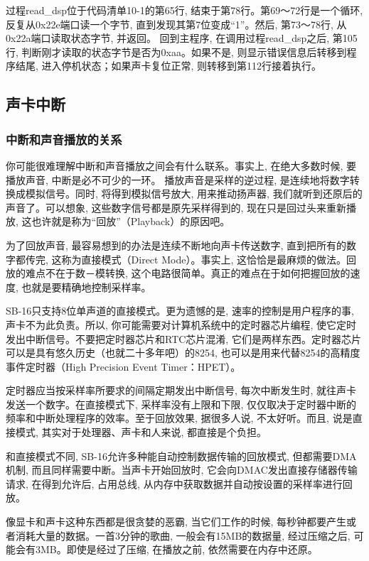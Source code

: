 \documentclass[12pt]{article}
\begin{document}
\begin{CJK}{UTF8}{gbsn}
过程read\_{}dsp位于代码清单10-1的第65行, 结束于第78行。第69～72行是一个循环, 反复从0x22e端口读一个字节, 直到发现其第7位变成“1”。然后, 第73～78行, 从0x22a端口读取状态字节, 并返回。
回到主程序, 在调用过程read\_{}dsp之后, 第105行, 判断刚才读取的状态字节是否为0xaa。如果不是, 则显示错误信息后转移到程序结尾, 进入停机状态；如果声卡复位正常, 则转移到第112行接着执行。

\subsection{声卡中断}
\subsubsection{中断和声音播放的关系}

你可能很难理解中断和声音播放之间会有什么联系。事实上, 在绝大多数时候, 要播放声音, 中断是必不可少的一环。
播放声音是采样的逆过程, 是连续地将数字转换成模拟信号。同时, 将得到模拟信号放大, 用来推动扬声器, 我们就听到还原后的声音了。可以想象, 这些数字信号都是原先采样得到的, 现在只是回过头来重新播放, 这也许就是称为“回放”（Playback）的原因吧。

为了回放声音, 最容易想到的办法是连续不断地向声卡传送数字, 直到把所有的数字都传完, 这称为直接模式（Direct Mode）。事实上, 这恰恰是最麻烦的做法。回放的难点不在于数－模转换, 这个电路很简单。真正的难点在于如何把握回放的速度, 也就是要精确地控制采样率。

SB-16只支持8位单声道的直接模式。更为遗憾的是, 速率的控制是用户程序的事, 声卡不为此负责。所以, 你可能需要对计算机系统中的定时器芯片编程, 使它定时发出中断信号。不要把定时器芯片和RTC芯片混淆, 它们是两样东西。定时器芯片可以是具有悠久历史（也就二十多年吧）的8254, 也可以是用来代替8254的高精度事件定时器（High Precision Event Timer：HPET）。

定时器应当按采样率所要求的间隔定期发出中断信号, 每次中断发生时, 就往声卡发送一个数字。在直接模式下, 采样率没有上限和下限, 仅仅取决于定时器中断的频率和中断处理程序的效率。至于回放效果, 据很多人说, 不太好听。而且, 说是直接模式, 其实对于处理器、声卡和人来说, 都直接是个负担。

和直接模式不同, SB-16允许多种能自动控制数据传输的回放模式, 但都需要DMA机制, 而且同样需要中断。当声卡开始回放时, 它会向DMAC发出直接存储器传输请求, 在得到允许后, 占用总线, 从内存中获取数据并自动按设置的采样率进行回放。

像显卡和声卡这种东西都是很贪婪的恶霸, 当它们工作的时候, 每秒钟都要产生或者消耗大量的数据。一首3分钟的歌曲, 一般会有15MB的数据量, 经过压缩之后, 可能会有3MB。即使是经过了压缩, 在播放之前, 依然需要在内存中还原。


\end{CJK}
\end{document}
